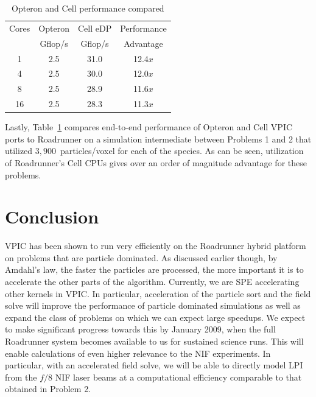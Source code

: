 \documentclass[journal,twoside]{IEEEtran}
\newcommand{\tbl}[1]{Table~\ref{tbl:#1}}
\begin{document}
\begin{table}
\caption{Opteron and Cell performance compared}
\begin{center}
\begin{tabular}{c c c c}
\hline
\hline
Cores & Opteron & Cell eDP & Performance \\
      & Gflop/s &  Gflop/s &  Advantage  \\
\hline
    1 &     2.5 &     31.0 &     12.4$x$ \\
    4 &     2.5 &     30.0 &     12.0$x$ \\
    8 &     2.5 &     28.9 &     11.6$x$ \\
   16 &     2.5 &     28.3 &     11.3$x$ \\
\hline
\end{tabular}
\end{center}
\label{tbl:opteron-cell-compared}
\end{table}

Lastly, \tbl{opteron-cell-compared} compares end-to-end performance of
Opteron and Cell VPIC ports to Roadrunner on a simulation intermediate
between Problems 1 and 2 that utilized $3,900$~particles/voxel for
each of the species.  As can be seen, utilization of Roadrunner's Cell
CPUs gives over an order of magnitude advantage for these problems.

\section{Conclusion}

VPIC has been shown to run very efficiently on the Roadrunner hybrid
platform on problems that are particle dominated.  As discussed
earlier though, by Amdahl's law, the faster the particles are
processed, the more important it is to accelerate the other parts of
the algorithm.  Currently, we are SPE accelerating other kernels in
VPIC.  In particular, acceleration of the particle sort and the field
solve will improve the performance of particle dominated simulations
as well as expand the class of problems on which we can expect large
speedups.  We expect to make significant progress towards this by
January 2009, when the full Roadrunner system becomes available to us
for sustained science runs.  This will enable calculations of even
higher relevance to the NIF experiments. In particular, with an
accelerated field solve, we will be able to directly model LPI from
the $f/8$ NIF laser beams at a computational efficiency comparable to
that obtained in Problem 2.
\end{document}
